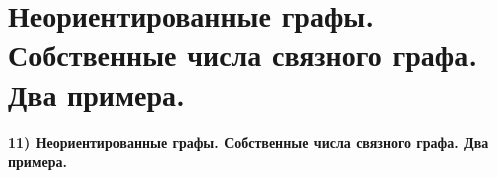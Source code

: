 \section{
 Неориентированные графы. Собственные числа связного графа. Два примера.
}

\textbf{11) Неориентированные графы. Собственные числа связного графа. Два примера.}
